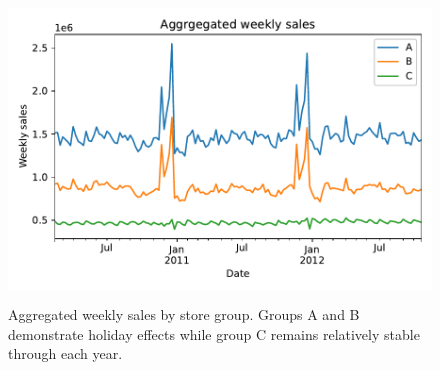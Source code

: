 \documentclass[english, 12pt, a4paper, sci, utf8, a-1b, online]{aaltothesis}
\begin{document}
\begin{figure}[htb]
	\centering
	\includegraphics[height=8cm]{../plots/dataset/dataset_plot_y.pdf}
	\caption{Aggregated weekly sales by store group. Groups A and B demonstrate holiday effects while group C remains relatively stable through each year.
	}
	\label{fig:data_y}
\end{figure}
\end{document}
